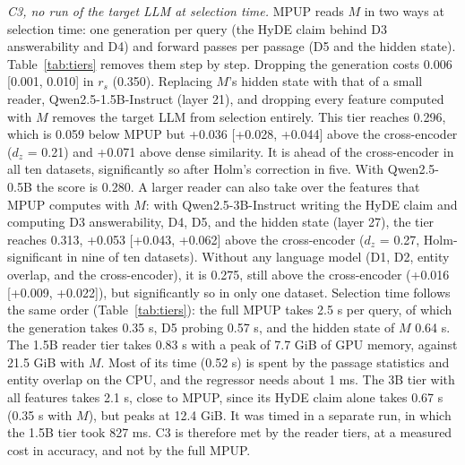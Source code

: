 \documentclass[preprint,12pt,authoryear]{elsarticle}
\begin{document}
\textit{C3, no run of the target LLM at selection time.} MPUP reads $M$ in two ways at selection time: one generation per query (the HyDE claim behind D3 answerability and D4) and forward passes per passage (D5 and the hidden state). Table~\ref{tab:tiers} removes them step by step. Dropping the generation costs 0.006 [0.001, 0.010] in $r_s$ (0.350). Replacing $M$'s hidden state with that of a small reader, Qwen2.5-1.5B-Instruct (layer 21), and dropping every feature computed with $M$ removes the target LLM from selection entirely. This tier reaches 0.296, which is 0.059 below MPUP but +0.036 [+0.028, +0.044] above the cross-encoder ($d_z$ = 0.21) and +0.071 above dense similarity. It is ahead of the cross-encoder in all ten datasets, significantly so after Holm's correction in five. With Qwen2.5-0.5B the score is 0.280. A larger reader can also take over the features that MPUP computes with $M$: with Qwen2.5-3B-Instruct writing the HyDE claim and computing D3 answerability, D4, D5, and the hidden state (layer 27), the tier reaches 0.313, +0.053 [+0.043, +0.062] above the cross-encoder ($d_z$ = 0.27, Holm-significant in nine of ten datasets). Without any language model (D1, D2, entity overlap, and the cross-encoder), it is 0.275, still above the cross-encoder (+0.016 [+0.009, +0.022]), but significantly so in only one dataset. Selection time follows the same order (Table~\ref{tab:tiers}): the full MPUP takes 2.5 s per query, of which the generation takes 0.35 s, D5 probing 0.57 s, and the hidden state of $M$ 0.64 s. The 1.5B reader tier takes 0.83 s with a peak of 7.7 GiB of GPU memory, against 21.5 GiB with $M$. Most of its time (0.52 s) is spent by the passage statistics and entity overlap on the CPU, and the regressor needs about 1 ms. The 3B tier with all features takes 2.1 s, close to MPUP, since its HyDE claim alone takes 0.67 s (0.35 s with $M$), but peaks at 12.4 GiB. It was timed in a separate run, in which the 1.5B tier took 827 ms. C3 is therefore met by the reader tiers, at a measured cost in accuracy, and not by the full MPUP.
\end{document}
